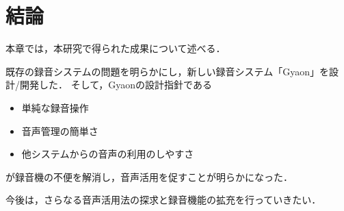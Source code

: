 \chapter{結論}
\label{chap:conclusion}

本章では，本研究で得られた成果について述べる．

\newpage

既存の録音システムの問題を明らかにし，新しい録音システム「Gyaon」を設計/開発した．
そして，Gyaonの設計指針である

\begin{itemize}
\item 単純な録音操作
\item 音声管理の簡単さ
\item 他システムからの音声の利用のしやすさ
\end{itemize}

が録音機の不便を解消し，音声活用を促すことが明らかになった．

今後は，さらなる音声活用法の探求と録音機能の拡充を行っていきたい．
